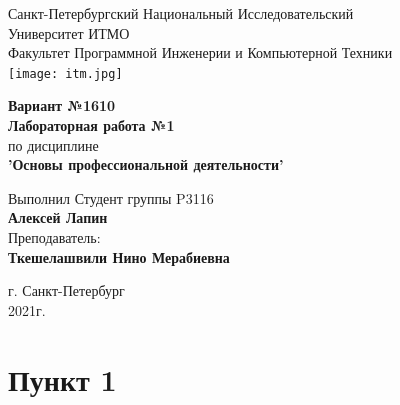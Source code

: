 \documentclass[12pt,onecolumn]{article}
\begin{document}
\setcounter{tocdepth}{4}
\begin{center}
    Санкт-Петербургский Национальный Исследовательский\\ 
    Университет ИТМО\\
    Факультет Программной Инженерии и Компьютерной Техники\\
    \texttt{[image: itm.jpg]} %
\end{center}
\vspace{1cm}


\begin{center}
    \large \textbf{Вариант №1610}\\
    \textbf{Лабораторная работа №1}\\
    по дисциплине\\
    \textbf{'Основы профессиональной деятельности'}
\end{center}

\vspace{2cm}

\begin{flushright}
  Выполнил Студент  группы P3116\\
  \textbf{Алексей Лапин}\\
  Преподаватель: \\
  \textbf{Ткешелашвили Нино Мерабиевна }\\
\end{flushright}

\vspace{6cm}
\begin{center}
    г. Санкт-Петербург\\
    2021г.
\end{center}

\newpage
\tableofcontents
\newpage

\section{Пункт 1}
\end{document}

